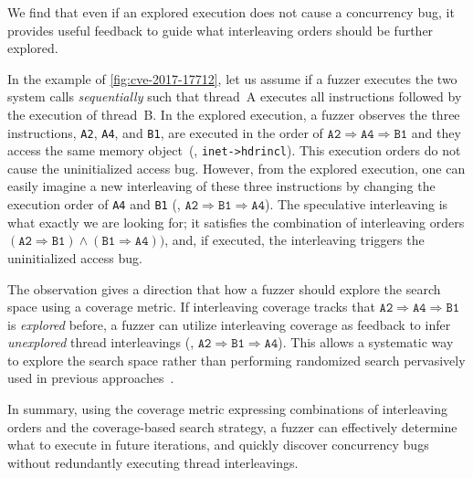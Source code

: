 %
We find that even if an explored execution does not cause 
a concurrency bug, it provides useful feedback 
to guide what interleaving orders should be further explored.

In the example of \autoref{fig:cve-2017-17712}, let us assume 
if a fuzzer executes the two system calls \textit{sequentially} 
such that thread~A executes all instructions followed by the execution of thread~B. 
In the explored execution, a fuzzer observes the three
instructions, \texttt{A2}, \texttt{A4}, and \texttt{B1}, are executed
in the order of
$\texttt{A2} \Rightarrow \texttt{A4} \Rightarrow \texttt{B1}$ and
they access the same memory object~(\ie, \texttt{inet->hdrincl}).
%
This execution orders do not cause the uninitialized access bug.
%
However, from the explored execution, one can easily imagine a new interleaving of these three
instructions by changing the execution order of \texttt{A4} and
\texttt{B1} (\ie,
$\texttt{A2} \Rightarrow \texttt{B1} \Rightarrow \texttt{A4}$).
%
The speculative interleaving is what exactly we are looking for; it
satisfies the combination of interleaving orders
$(\texttt{A2} \Rightarrow \texttt{B1}) \wedge (\texttt{B1} \Rightarrow
\texttt{A4}))$, and, if executed, the interleaving triggers the
uninitialized access bug.

%
%
The observation gives a direction that how a fuzzer should explore 
the search space using a coverage metric.
If interleaving coverage tracks that
$\texttt{A2} \Rightarrow \texttt{A4} \Rightarrow \texttt{B1}$ is
\textit{explored} before, a fuzzer can utilize interleaving
coverage as feedback to infer \textit{unexplored} thread interleavings (\eg,
$\texttt{A2} \Rightarrow \texttt{B1} \Rightarrow \texttt{A4}$).
%
This allows a systematic way to explore the search space rather than
performing randomized search pervasively used in previous
approaches~\cite{ski, krace, pctalgorithm, muzz}.%
%

In summary, using the coverage metric expressing combinations of interleaving orders and the coverage-based search strategy, a fuzzer can effectively determine what to execute in future iterations, and quickly discover concurrency bugs
without redundantly executing thread interleavings.

